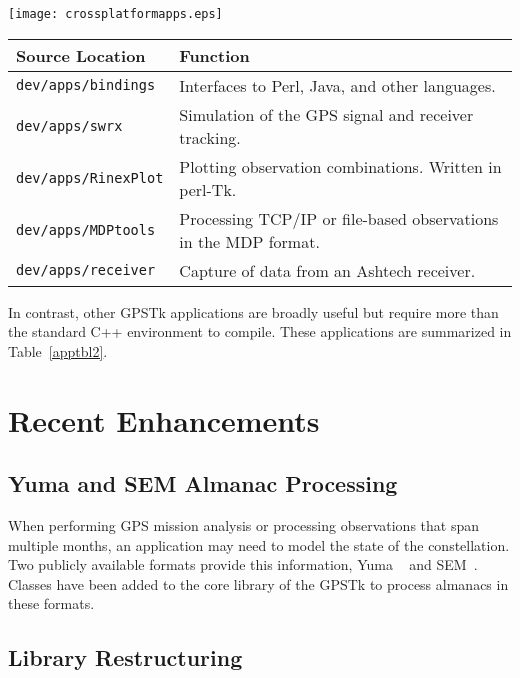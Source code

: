 \documentclass[letterpaper,ugly,10pt]{ion-gps}
\newcommand{\gpstkdir}[1]{\texttt{\mbox{#1}}}
\begin{document}
\begin{table*}
	\centering
	\texttt{[image: crossplatformapps.eps]}
	\caption{Cross platform applications.}
	\label{apptbl}
\end{table*}

\begin{table*}
\centering
\begin{tabular}{ll} \hline \hline
Source Location &  Function \\ \hline
\gpstkdir{dev/apps/bindings} & Interfaces to Perl, Java, and other languages. \\
\gpstkdir{dev/apps/swrx} & Simulation of the GPS signal and receiver tracking. \\
\gpstkdir{dev/apps/RinexPlot} & Plotting observation combinations. Written in perl-Tk. \\
\gpstkdir{dev/apps/MDPtools} & Processing TCP/IP or file-based observations in the MDP format.\\
\gpstkdir{dev/apps/receiver} & Capture of data from an Ashtech receiver. \\ \hline \hline 
\end{tabular}
\caption{Applications with dependencies outside standard C++}
\label{apptbl2}
\end{table*}

In contrast, other GPSTk applications are broadly useful but require more than the standard C++ environment to compile. These applications are summarized in Table~\ref{apptbl2}.


\section*{Recent Enhancements}

\subsection*{Yuma and SEM Almanac Processing}

When performing GPS mission analysis or processing observations that span multiple months, an application may need to model the state of the constellation. Two publicly available formats provide this information, Yuma \mbox{ \cite{yumaformat}} and \mbox{SEM \cite{semformat}}. Classes have been added to the core library of the GPSTk to process almanacs in these formats.

\subsection*{Library Restructuring}
\end{document}
